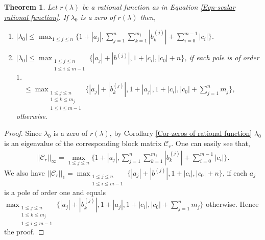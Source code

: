 \documentclass[12pt, reqno]{amsart}
\newtheorem{theorem}{Theorem}[section]
\theoremstyle{definition}
\theoremstyle{remark}
\numberwithin{equation}{section}
\begin{document}
\begin{theorem}\label{Thm-bounds for zeros using norms}
Let $r(\lambda)$ be a rational function as in Equation \eqref{Eqn-scalar rational function}. If 
$\lambda_0$ is a zero of $r(\lambda)$ then,
\begin{enumerate}
\item $\displaystyle  |\lambda_0| \leq \max_{1 \leq j \leq n} \bigg\{1+|a_j|, 
\sum_{j=1}^{n} \sum_{k=1}^{m_j}|b_k^{(j)}|+ \sum_{i=0}^{m-1}|c_i| \bigg\}$.

\item 
$ |\lambda_0| \leq 
\displaystyle \max_{\substack{\text{$1 \leq j \leq n$}\\ \text {$1 \leq i \leq m-1$}}} 
\bigg\{|a_j|+|b^{(j)}|, 1+|c_i|, |c_0|+ n \bigg\}$,  if each pole is of order $1$.\\


\ \ $\leq \displaystyle \max_{\substack{\text{$1 \leq j \leq n$}\\ 
\text{$1 \leq k \leq m_j$} \\ \text {$1 \leq i \leq m-1$}}} 
\bigg\{|a_j|+|b_k^{(j)}|, 1+|a_j|, 1+|c_i|, |c_0|+ \sum_{j=1}^{n}m_j \bigg\}$, otherwise.

%

\end{enumerate}
\end{theorem}

\begin{proof}
Since $\lambda_0$ is a zero of $r(\lambda)$, by Corollary \ref{Cor-zeros of rational function} 
$\lambda_0$ is an eigenvalue of the corresponding block matrix $\mathcal{C}_r$. One 
can easily see that, 
\begin{align*}
||\mathcal{C}_r||_\infty \displaystyle= \max_{1 \leq j \leq n} \bigg\{1+|a_j|, 
\sum_{j=1}^{n} \sum_{k=1}^{m_j}|b_k^{(j)}|+ \sum_{i=0}^{m-1}|c_i| \bigg\}.
\end{align*}
We also have 
$||\mathcal{C}_r||_1 \displaystyle = \max_{\substack{1 \leq j \leq n \\ 1 \leq i \leq m-1}} 
\bigg\{|a_j|+|b^{(j)}|, 1+|c_i|, |c_0|+ n 
\bigg\}$, if each $a_j$ is a pole of order one and equals 
$\displaystyle \max_{\substack{1 \leq j \leq n \\ 1 \leq k \leq m_j\\ 1 \leq i 
\leq m-1}} \bigg\{|a_j|+|b_k^{(j)}|, 1+|a_j|, 1+|c_i|, |c_0|+ \sum_{j=1}^{n}m_j \bigg\}$ 
otherwise. Hence the proof.
\end{proof}
\end{document}
